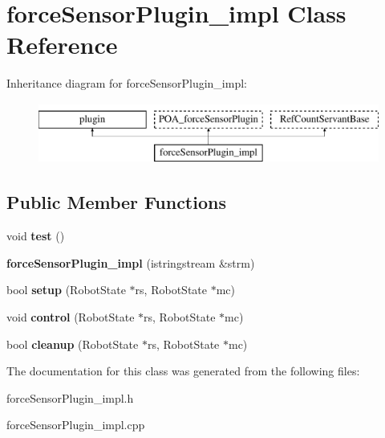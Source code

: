 \hypertarget{classforceSensorPlugin__impl}{\section{force\-Sensor\-Plugin\-\_\-impl Class Reference}
\label{classforceSensorPlugin__impl}
}
Inheritance diagram for force\-Sensor\-Plugin\-\_\-impl\-:\begin{figure}[H]
\begin{center}
\leavevmode
\includegraphics[height=2.000000cm]{classforceSensorPlugin__impl}
\end{center}
\end{figure}
\subsection*{Public Member Functions}
\begin{DoxyCompactItemize}
\item 
\hypertarget{classforceSensorPlugin__impl_ae7f2caafa5e19053c5d6c8b7d709a9d8}{void {\bfseries test} ()}\label{classforceSensorPlugin__impl_ae7f2caafa5e19053c5d6c8b7d709a9d8}

\item 
\hypertarget{classforceSensorPlugin__impl_a81bdec7eb5ce41b6342f0065754d451a}{{\bfseries force\-Sensor\-Plugin\-\_\-impl} (istringstream \&strm)}\label{classforceSensorPlugin__impl_a81bdec7eb5ce41b6342f0065754d451a}

\item 
\hypertarget{classforceSensorPlugin__impl_af36d740b9ac2d1aba8a2ed154c9dda48}{bool {\bfseries setup} (Robot\-State $\ast$rs, Robot\-State $\ast$mc)}\label{classforceSensorPlugin__impl_af36d740b9ac2d1aba8a2ed154c9dda48}

\item 
\hypertarget{classforceSensorPlugin__impl_abde11c5b0c37806e484d22640a334d8c}{void {\bfseries control} (Robot\-State $\ast$rs, Robot\-State $\ast$mc)}\label{classforceSensorPlugin__impl_abde11c5b0c37806e484d22640a334d8c}

\item 
\hypertarget{classforceSensorPlugin__impl_afb719dc4e48bd1fda7231b86e5497203}{bool {\bfseries cleanup} (Robot\-State $\ast$rs, Robot\-State $\ast$mc)}\label{classforceSensorPlugin__impl_afb719dc4e48bd1fda7231b86e5497203}

\end{DoxyCompactItemize}


The documentation for this class was generated from the following files\-:\begin{DoxyCompactItemize}
\item 
force\-Sensor\-Plugin\-\_\-impl.\-h\item 
force\-Sensor\-Plugin\-\_\-impl.\-cpp\end{DoxyCompactItemize}
